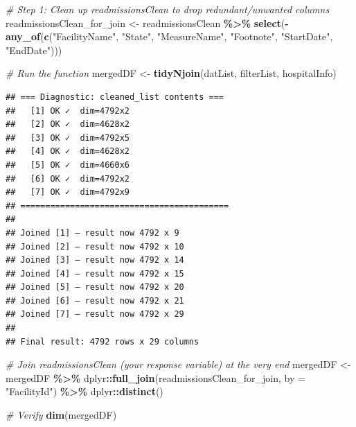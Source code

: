 \documentclass[
]{article}
\newenvironment{Shaded}{\begin{snugshade}}{\end{snugshade}}
\newcommand{\AttributeTok}[1]{\textcolor[rgb]{0.13,0.29,0.53}{#1}}
\newcommand{\CommentTok}[1]{\textcolor[rgb]{0.56,0.35,0.01}{\textit{#1}}}
\newcommand{\FunctionTok}[1]{\textcolor[rgb]{0.13,0.29,0.53}{\textbf{#1}}}
\newcommand{\NormalTok}[1]{#1}
\newcommand{\OtherTok}[1]{\textcolor[rgb]{0.56,0.35,0.01}{#1}}
\newcommand{\SpecialCharTok}[1]{\textcolor[rgb]{0.81,0.36,0.00}{\textbf{#1}}}
\newcommand{\StringTok}[1]{\textcolor[rgb]{0.31,0.60,0.02}{#1}}
\begin{document}
\begin{Shaded}
\begin{Highlighting}[]
\CommentTok{\# Step 1: Clean up readmissionsClean to drop redundant/unwanted columns}
\NormalTok{readmissionsClean\_for\_join }\OtherTok{\textless{}{-}}\NormalTok{ readmissionsClean }\SpecialCharTok{\%\textgreater{}\%}
    \FunctionTok{select}\NormalTok{(}\SpecialCharTok{{-}}\FunctionTok{any\_of}\NormalTok{(}\FunctionTok{c}\NormalTok{(}\StringTok{"FacilityName"}\NormalTok{, }\StringTok{"State"}\NormalTok{, }\StringTok{"MeasureName"}\NormalTok{,}
                     \StringTok{"Footnote"}\NormalTok{, }\StringTok{"StartDate"}\NormalTok{, }\StringTok{"EndDate"}\NormalTok{)))}

\CommentTok{\# Run the function}
\NormalTok{mergedDF }\OtherTok{\textless{}{-}} \FunctionTok{tidyNjoin}\NormalTok{(datList, filterList, hospitalInfo)}
\end{Highlighting}
\end{Shaded}

\begin{verbatim}
## === Diagnostic: cleaned_list contents ===
##   [1] OK ✓  dim=4792x2
##   [2] OK ✓  dim=4628x2
##   [3] OK ✓  dim=4792x5
##   [4] OK ✓  dim=4628x2
##   [5] OK ✓  dim=4660x6
##   [6] OK ✓  dim=4792x2
##   [7] OK ✓  dim=4792x9
## ==========================================
## 
## Joined [1] — result now 4792 x 9
## Joined [2] — result now 4792 x 10
## Joined [3] — result now 4792 x 14
## Joined [4] — result now 4792 x 15
## Joined [5] — result now 4792 x 20
## Joined [6] — result now 4792 x 21
## Joined [7] — result now 4792 x 29
## 
## Final result: 4792 rows x 29 columns
\end{verbatim}

\begin{Shaded}
\begin{Highlighting}[]
\CommentTok{\# Join readmissionsClean (your response variable) at the very end}
\NormalTok{mergedDF }\OtherTok{\textless{}{-}}\NormalTok{ mergedDF }\SpecialCharTok{\%\textgreater{}\%}
\NormalTok{    dplyr}\SpecialCharTok{::}\FunctionTok{full\_join}\NormalTok{(readmissionsClean\_for\_join, }\AttributeTok{by =} \StringTok{"FacilityId"}\NormalTok{) }\SpecialCharTok{\%\textgreater{}\%}
\NormalTok{    dplyr}\SpecialCharTok{::}\FunctionTok{distinct}\NormalTok{()}

\CommentTok{\# Verify}
\FunctionTok{dim}\NormalTok{(mergedDF)}
\end{Highlighting}
\end{Shaded}
\end{document}
